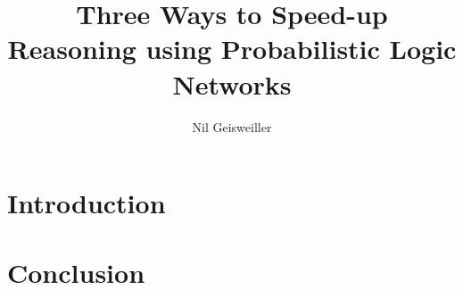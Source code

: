 \documentclass[runningheads]{llncs}
\begin{document}
%
\title{Three Ways to Speed-up Reasoning using Probabilistic Logic Networks}

%
\author{Nil Geisweiller
}
%
%
\maketitle              %
%

\begin{abstract}
  \keywords{}
\end{abstract}

\section{Introduction}

\section{Conclusion}

%
%
 
\end{document}

